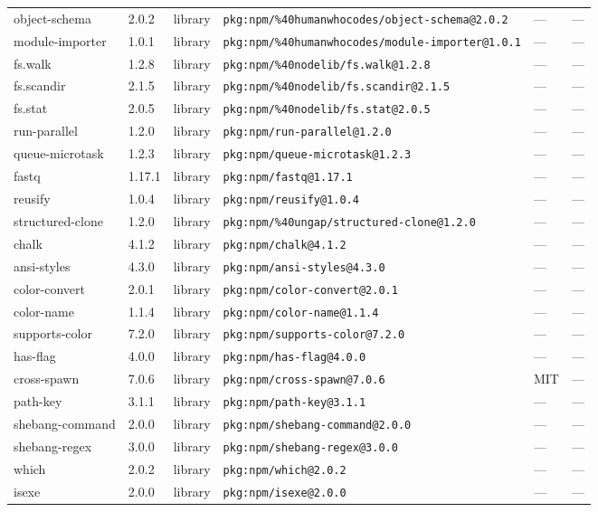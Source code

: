 \documentclass[11pt]{article}
\begin{document}
\begin{longtable}{|l|l|l|p{2.2cm}|l|p{4cm}|}
object-schema & 2.0.2 & library & \texttt{pkg:npm/\%40humanwhocodes/object-schema@2.0.2} & — & — \\
module-importer & 1.0.1 & library & \texttt{pkg:npm/\%40humanwhocodes/module-importer@1.0.1} & — & — \\
fs.walk & 1.2.8 & library & \texttt{pkg:npm/\%40nodelib/fs.walk@1.2.8} & — & — \\
fs.scandir & 2.1.5 & library & \texttt{pkg:npm/\%40nodelib/fs.scandir@2.1.5} & — & — \\
fs.stat & 2.0.5 & library & \texttt{pkg:npm/\%40nodelib/fs.stat@2.0.5} & — & — \\
run-parallel & 1.2.0 & library & \texttt{pkg:npm/run-parallel@1.2.0} & — & — \\
queue-microtask & 1.2.3 & library & \texttt{pkg:npm/queue-microtask@1.2.3} & — & — \\
fastq & 1.17.1 & library & \texttt{pkg:npm/fastq@1.17.1} & — & — \\
reusify & 1.0.4 & library & \texttt{pkg:npm/reusify@1.0.4} & — & — \\
structured-clone & 1.2.0 & library & \texttt{pkg:npm/\%40ungap/structured-clone@1.2.0} & — & — \\
chalk & 4.1.2 & library & \texttt{pkg:npm/chalk@4.1.2} & — & — \\
ansi-styles & 4.3.0 & library & \texttt{pkg:npm/ansi-styles@4.3.0} & — & — \\
color-convert & 2.0.1 & library & \texttt{pkg:npm/color-convert@2.0.1} & — & — \\
color-name & 1.1.4 & library & \texttt{pkg:npm/color-name@1.1.4} & — & — \\
supports-color & 7.2.0 & library & \texttt{pkg:npm/supports-color@7.2.0} & — & — \\
has-flag & 4.0.0 & library & \texttt{pkg:npm/has-flag@4.0.0} & — & — \\
cross-spawn & 7.0.6 & library & \texttt{pkg:npm/cross-spawn@7.0.6} & MIT & — \\
path-key & 3.1.1 & library & \texttt{pkg:npm/path-key@3.1.1} & — & — \\
shebang-command & 2.0.0 & library & \texttt{pkg:npm/shebang-command@2.0.0} & — & — \\
shebang-regex & 3.0.0 & library & \texttt{pkg:npm/shebang-regex@3.0.0} & — & — \\
which & 2.0.2 & library & \texttt{pkg:npm/which@2.0.2} & — & — \\
isexe & 2.0.0 & library & \texttt{pkg:npm/isexe@2.0.0} & — & — \\

\end{longtable}
\end{document}

